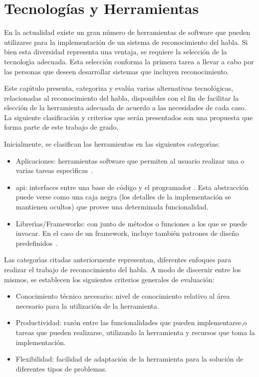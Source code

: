  \chapter{Tecnolog\'ias y Herramientas}
\label{sec:tecnologias}

En la actualidad existe un gran n\'umero de herramientas de software que pueden utilizarse para la implementaci\'on de un
sistema de reconocimiento del habla. Si bien esta diversidad representa una ventaja, se requiere
la selecci\'on de la tecnolog{\'\i}a adecuada. Esta selecci\'on conforma la primera tarea a llevar a
cabo por las personas que deseen desarrollar sistemas que incluyen reconocimiento.

Este cap{\'\i}tulo presenta, categoriza y eval\'ua varias alternativas tecnol\'ogicas, relacionadas al reconocimiento del habla, 
disponibles con el fin de facilitar la elecci\'on de la herramienta adecuada
de acuerdo a las necesidades de cada caso. La siguiente clasificaci\'on y criterios que ser\'an presentados son
una propuesta que forma parte de este trabajo de grado.

Inicialmente, se clasifican las herramientas en las siguientes categor{\'\i}as:
\begin{itemize}
	\item Aplicaciones: herramientas software que permiten al usuario realizar una o
	varias tareas \mbox{espec{\'\i}ficas \cite{GoodwillComputer}}.
    \item \gls{api}: interfaces entre una base de c\'odigo y
	el programador \cite{DoucetteOnApi}. Esta abstracci\'on puede verse como una caja negra
	(los detalles de la implementaci\'on se mantienen ocultos) que provee una determinada funcionalidad.
	\item Librer{\'\i}as/Frameworks: con junto de m\'etodos o funciones a los que se puede invocar.
	En el caso de un framework, incluye tambi\'en patrones de dise\~no
	\mbox{predefinidos \cite{FowlerInversion}}.
\end{itemize}

Las categor{\'\i}as citadas anteriormente representan, diferentes enfoques para realizar el trabajo
de reconocimiento del habla. A modo de discernir entre los mismos, se establecen
los siguientes criterios generales de evaluaci\'on:
\begin{itemize}
	\item Conocimiento t\'ecnico necesario: nivel de conocimiento relativo al \'area necesario para la
	utilizaci\'on de la herramienta. 
	\item Productividad: raz\'on entre las funcionalidades que pueden implementarse,o tareas que pueden
	realizarse, utilizando la herramienta y recursos que toma la implementaci\'on.
	\item Flexibilidad: facilidad de adaptaci\'on de la herramienta para la soluci\'on de diferentes
	tipos de problemas.
\end{itemize}

